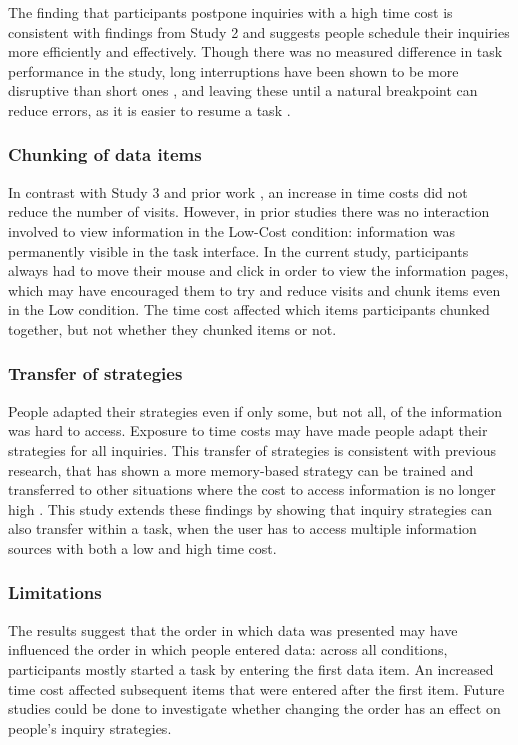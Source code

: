 The finding that participants postpone inquiries with a high time cost is consistent with findings from Study 2 and suggests people schedule their inquiries more efficiently and effectively. Though there was no measured difference in task performance in the study, long interruptions have been shown to be more disruptive than short ones \citep{Altmann2017, Monk2008}, and leaving these until a natural breakpoint can reduce errors, as it is easier to resume a task \citep{Gould2013a, Iqbal2005}.

\subsubsection{Chunking of data items}
In contrast with Study 3 and prior work \citep{Gray2006}, an increase in time costs did not reduce the number of visits. However, in prior studies there was no interaction involved to view information in the Low-Cost condition: information was permanently visible in the task interface. In the current study, participants always had to move their mouse and click in order to view the information pages, which may have encouraged them to try and reduce visits and chunk items even in the Low condition. The time cost affected which items participants chunked together, but not whether they chunked items or not.

\subsubsection{Transfer of strategies}
People adapted their strategies even if only some, but not all, of the information was hard to access. Exposure to time costs may have made people adapt their strategies for all inquiries. This transfer of strategies is consistent with previous research, that has shown a more memory-based strategy can be trained and transferred to other situations where the cost to access information is no longer high \citep{Patrick2014}. This study extends these findings by showing that inquiry strategies can also transfer within a task, when the user has to access multiple information sources with both a low and high time cost.

\subsubsection{Limitations}

The results suggest that the order in which data was presented may have influenced the order in which people entered data: across all conditions, participants mostly started a task by entering the first data item. An increased time cost affected subsequent items that were entered after the first item. Future studies could be done to investigate whether changing the order has an effect on people's inquiry strategies.

